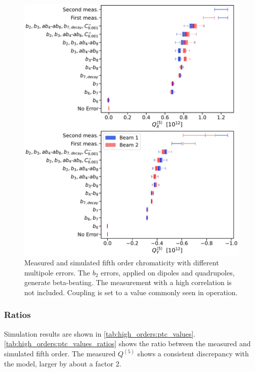 \begin{figure}[H]
    \centering
    \includegraphics[width=0.8\columnwidth]{images/q5_ptc.pdf}
    \caption{Measured and simulated fifth order chromaticity with different multipole errors. The
    $b_2$ errors, applied on dipoles and quadrupoles, generate beta-beating. The measurement with a
    high correlation is not included. Coupling is set to a value commonly seen in operation.}
    \label{fig:high_orders:beam1_q5_ptc}
\end{figure}



\subsubsection{Ratios}

Simulation results are shown in \cref{tab:high_orders:ptc_values}.
\cref{tab:high_orders:ptc_values_ratios} shows the ratio between the measured and simulated fifth
order. The measured $Q^{(5)}$ shows a consistent discrepancy with the model, larger by about
a factor 2.

